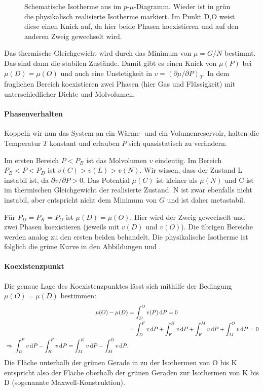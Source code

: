 \begin{figure}[htbp]
    \centering
    \tfigPhaseSeparationChemPotential
    \caption{Schematische Isotherme aus  im $p$-$\mu$-Diagramm. Wieder ist in grün die physikalisch realisierte Isotherme markiert. Im Punkt D,O weist diese einen Knick auf, da hier beide Phasen koexistieren und auf den anderen Zweig gewechselt wird. }
    \label{fig:PhaseSeparationChemPotential}
\end{figure}

Das thermische Gleichgewicht wird durch das Minimum von $\mu=G/N$ bestimmt. Das sind dann die stabilen Zustände.  Damit gibt es einen Knick von $\mu(P)$ bei $\mu(D)=\mu(O)$ und auch eine Unstetigkeit in $v=(\partial\mu/\partial P)_T$. In dem fraglichen Bereich koexistieren zwei Phasen (hier Gas und Flüssigkeit) mit unterschiedlicher Dichte und Molvolumen.


\paragraph*{Phasenverhalten}

Koppeln wir nun das System an ein Wärme- und ein Volumenreservoir, halten die Temperatur $T$ konstant und erlauben $P$ sich quasistatisch zu verändern.

Im ersten Bereich $P<P_B$ ist das Molvolumen $v$ eindeutig. Im Bereich $P_B<P<P_D$ ist $v(C)>v(L)>v(N)$. Wir wissen, dass der Zustand L instabil ist, da $\partial v/\partial P>0$. Das Potential $\mu(C)$ ist kleiner als $\mu(N)$ und C ist im thermischen Gleichgewicht der realisierte Zustand. N ist zwar ebenfalls nicht instabil, aber entspricht nicht dem Minimum von $G$ und ist daher metastabil.

Für $P_D=P_K=P_O$ ist $\mu(D) = \mu(O)$. Hier wird der Zweig gewechselt und zwei Phasen koexistieren (jeweils mit $v(D)$ und $v(O)$). Die übrigen Bereiche werden analog zu den ersten beiden behandelt. Die physikalische Isotherme ist folglich die grüne Kurve in den Abbildungen  und .


\paragraph*{Koexistenzpunkt}

Die genaue Lage des Koexistenzpunktes lässt sich mithilfe der Bedingung $\mu(O)=\mu(D)$ bestimmen:
\begin{align*}
    \mu(O)-\mu(D) & = \int_D^Ov(P)\diff P \overset{!}{=}0                                       \\
                  & = \int_D^F v\diff P+\int_F^K v\diff P+\int_K^M v\diff P+\int_M^O v\diff P=0 \\
    \implication \int_D^F v\diff P-\int_K^F v\diff P=\int_M^K v\diff P-\int_M^O v\diff P.
\end{align*}
Die Fläche unterhalb der grünen Gerade in  zu der Isothermen von O bis K entspricht also der Fläche oberhalb der grünen Geraden zur Isothermen von K bis D (sogenannte Maxwell-Konstruktion).


